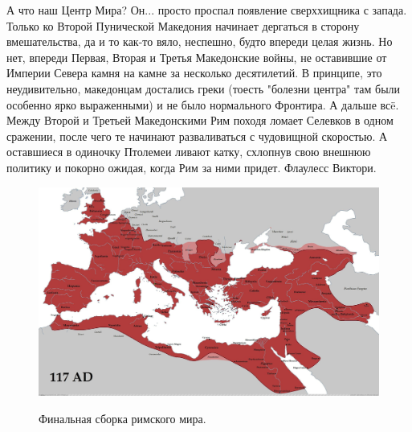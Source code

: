 А что наш Центр Мира? Он... просто проспал появление сверххищника с запада. Только ко Второй Пунической Македония начинает дергаться в сторону вмешательства, да и то как-то вяло, неспешно, будто впереди целая жизнь. Но нет, впереди Первая, Вторая и Третья Македонские войны, не оставившие от Империи Севера камня на камне за несколько десятилетий. В принципе, это неудивительно, македонцам достались греки (тоесть "болезни центра" там были особенно ярко выраженными) и не было нормального Фронтира. А дальше всë. Между Второй и Третьей Македонскими Рим походя ломает Селевков в одном сражении, после чего те начинают разваливаться с чудовищной скоростью. А оставшиеся в одиночку Птолемеи ливают катку, схлопнув свою внешнюю политику и покорно ожидая, когда Рим за ними придет. Флаулесс Виктори.

\begin{figure}[h!tb]
	\centering\includegraphics[scale=0.25]{regional_hehemons/1613656483182828728.png}
	\label{fig:heh10} %
	\caption{Финальная сборка римского мира.  }
\end{figure}

